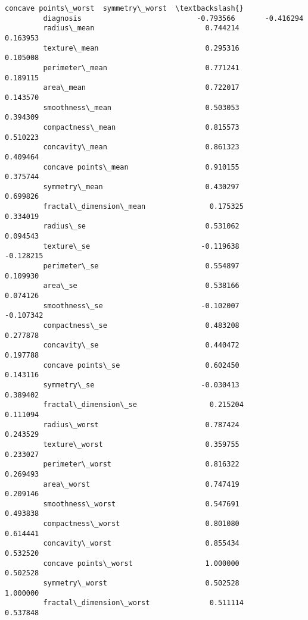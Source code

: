 \documentclass[11pt]{article}
\begin{document}
\begin{Verbatim}[commandchars=\\\{\}]
                                  concave points\_worst  symmetry\_worst  \textbackslash{}
         diagnosis                           -0.793566       -0.416294   
         radius\_mean                          0.744214        0.163953   
         texture\_mean                         0.295316        0.105008   
         perimeter\_mean                       0.771241        0.189115   
         area\_mean                            0.722017        0.143570   
         smoothness\_mean                      0.503053        0.394309   
         compactness\_mean                     0.815573        0.510223   
         concavity\_mean                       0.861323        0.409464   
         concave points\_mean                  0.910155        0.375744   
         symmetry\_mean                        0.430297        0.699826   
         fractal\_dimension\_mean               0.175325        0.334019   
         radius\_se                            0.531062        0.094543   
         texture\_se                          -0.119638       -0.128215   
         perimeter\_se                         0.554897        0.109930   
         area\_se                              0.538166        0.074126   
         smoothness\_se                       -0.102007       -0.107342   
         compactness\_se                       0.483208        0.277878   
         concavity\_se                         0.440472        0.197788   
         concave points\_se                    0.602450        0.143116   
         symmetry\_se                         -0.030413        0.389402   
         fractal\_dimension\_se                 0.215204        0.111094   
         radius\_worst                         0.787424        0.243529   
         texture\_worst                        0.359755        0.233027   
         perimeter\_worst                      0.816322        0.269493   
         area\_worst                           0.747419        0.209146   
         smoothness\_worst                     0.547691        0.493838   
         compactness\_worst                    0.801080        0.614441   
         concavity\_worst                      0.855434        0.532520   
         concave points\_worst                 1.000000        0.502528   
         symmetry\_worst                       0.502528        1.000000   
         fractal\_dimension\_worst              0.511114        0.537848   
         

\end{Verbatim}
\end{document}
